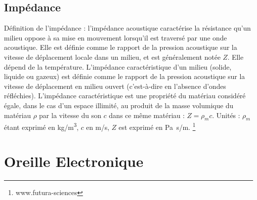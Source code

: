 \subsection{Impédance}
\label{impedance}
Définition de l'impédance : l'impédance acoustique
caractérise la résistance qu'un milieu oppose à sa mise en mouvement
lorsqu'il est traversé par une onde acoustique. Elle est définie comme
le rapport de la pression acoustique sur la vitesse de déplacement
locale dans un milieu, et est généralement notée $Z$. Elle dépend de
la température. L'impédance caractéristique d'un milieu (solide, liquide
ou gazeux) est définie comme le rapport de la pression acoustique
sur la vitesse de déplacement en milieu ouvert (c'est-à-dire
en l'absence d'ondes réfléchies). L'impédance caractéristique est
une propriété du matériau considéré égale, dans le cas d'un espace
illimité, au produit de la masse volumique du matériau $\rho$
par la vitesse du son $c$ dans ce même matériau : $Z = \rho_{m} c$.
Unités : $\rho_{m}$ étant exprimé en \si{kg/m\cubed},
$c$ en \si{m/s}, $Z$ est
exprimé en \si{\pascal . s/m}. \footnote{www.futura-sciences}




\section{Oreille Electronique}
\label{oreilleelectronique}


